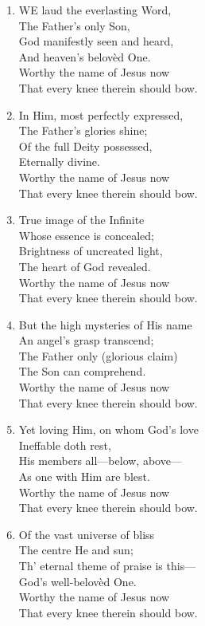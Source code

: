 \begin{enumerate}
    \item WE laud the everlasting Word, \\
        The Father's only Son, \\
        God manifestly seen and heard, \\
        And heaven's belov\`ed One. \\
        Worthy the name of Jesus now \\
        That every knee therein should bow.

    \item In Him, most perfectly expressed, \\
        The Father's glories shine; \\
        Of the full Deity possessed, \\
        Eternally divine. \\
        Worthy the name of Jesus now \\
        That every knee therein should bow.

    \item True image of the Infinite \\
        Whose essence is concealed; \\
        Brightness of uncreated light, \\
        The heart of God revealed. \\
        Worthy the name of Jesus now \\
        That every knee therein should bow.

    \item But the high mysteries of His name \\
        An angel's grasp transcend; \\
        The Father only (glorious claim) \\
        The Son can comprehend. \\
        Worthy the name of Jesus now \\
        That every knee therein should bow.

    \item Yet loving Him, on whom God's love \\
        Ineffable doth rest, \\
        His members all---below, above--- \\
        As one with Him are blest. \\
        Worthy the name of Jesus now \\
        That every knee therein should bow.

    \item Of the vast universe of bliss \\
        The centre He and sun; \\
        Th' eternal theme of praise is this--- \\
        God's well-belov\`ed One. \\
        Worthy the name of Jesus now \\
        That every knee therein should bow.

\end{enumerate}

